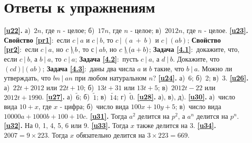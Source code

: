 
\newpage

\section{Ответы к упражнениям}
\textbf{\ref{u22}.} а)~$2n$, где $n$ - целое; б)~$17n$, где $n$ - целое; в)~$2012n$, где $n$ - целое. 
\textbf{\ref{u23}.} \textbf{Свойство \ref{pr1}}:~если $c~|~a$  и $c~|~b$, то $c~|~(a~+~b)$ и $c~|~(ab)$; \textbf{Свойство \ref{pr2}}:~если $c~|~a$, но $c~\mathrlap{\backslash}|~b$, то $с~|~ab$, но $c~\mathrlap{\backslash}|~(a+b)$; \textbf{Задача \ref{4.1}}:~докажите, что, если $c~|~b$, а $b~|~a$, то $c~|~a$; \textbf{Задача \ref{4.2}}:~пусть $c~|~a$, а $d~|~b$. Докажите, что $(cd)|(ab)$; \textbf{Задача \ref{4.3}}:~даны два числа $a$ и $b$ такие, что $b~|~a$. Можно ли утверждать, что $bn~|~an$ при любом натуральном $n$? 
\textbf{\ref{u24}.} а)~6; б)~2; в)~3.
\textbf{\ref{u26}.} а)~$22t+2012$ или $22t+10$; б)~$13t+31$ или $13t+5$; в)~$2012t-22$ или $2012t+1990$.
\textbf{\ref{u27}.} а)~$\tilde{6}$; б)~$\tilde{1}$; в)~$\tilde{14}$; г)~$\tilde{0}$.
\textbf{\ref{u28}.} а), в), д).
\textbf{\ref{u30}.} а)~число вида $10+x$, где $x$ - цифра; б)~число вида $100x+10y+5$; в)~число вида $10000a + 1000b + 100 + 10c$.
\textbf{\ref{u31}.} Тогда $a^2$ делится на $p^2$, а $a^n$ делится на $p^n$. 
\textbf{\ref{u32}.} На 0, 1, 4, 5, 6 или 9. 
\textbf{\ref{u33}.} Тогда $x$ также делится на 3.
\textbf{\ref{u34}.} $2007 = 9 \times 223$. Тогда $x$ обязательно делится на $3 \times 223 = 669$.